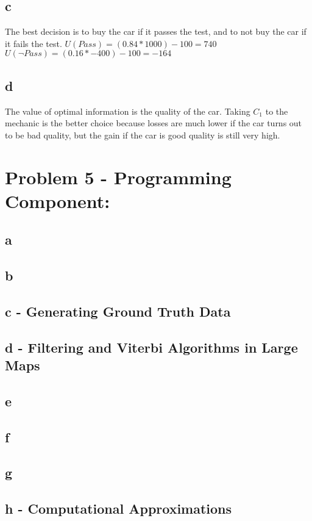 \documentclass[11pt, oneside]{article}   	%
\begin{document}
\begin{flushleft}
\subsection*{c}
The best decision is to buy the car if it passes the test, and to not buy the car if it fails the test.
$U(Pass) = (0.84 * 1000) - 100 = 740$\\
$U(\neg Pass) = (0.16 * -400) - 100 = -164$\\
\subsection*{d}
The value of optimal information is the quality of the car. Taking $C_1$ to the mechanic is the better choice because losses are much lower if the car turns out to be bad quality, but the gain if the car is good quality is still very high.
\section*{Problem 5 - Programming Component:}
\subsection*{a}
\subsection*{b}
\subsection*{c - Generating Ground Truth Data}
\subsection*{d - Filtering and Viterbi Algorithms in Large Maps}
\subsection*{e}
\subsection*{f}
\subsection*{g}
\subsection*{h - Computational Approximations}
\end{flushleft}
\end{document}
